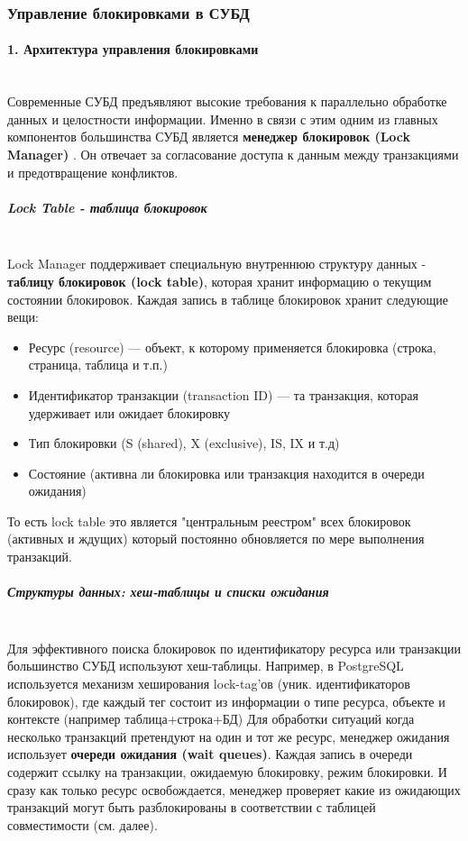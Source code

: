 \subsubsection{Управление блокировками в СУБД}

\paragraph{1. Архитектура управления блокировками} ~\\

Современные СУБД предъявляют высокие требования к параллельно обработке данных и целостности информации. Именно в связи с этим одним из главных компонентов большинства СУБД является \textbf{менеджер блокировок (Lock Manager)} \autocite{Silberschatz}. Он отвечает за согласование доступа к данным между транзакциями и предотвращение конфликтов.

\subparagraph{Lock Table - таблица блокировок} ~\\
 Lock Manager поддерживает специальную внутреннюю структуру данных - \textbf{таблицу блокировок (lock table)}, которая хранит информацию о текущим состоянии блокировок. Каждая запись в таблице блокировок хранит следующие вещи:
 \begin{itemize}
     \item Ресурс (resource) — объект, к которому применяется блокировка (строка, страница, таблица и т.п.)
     \item Идентификатор транзакции (transaction ID) — та транзакция, которая удерживает или ожидает блокировку
     \item Тип блокировки (S (shared), X (exclusive), IS, IX и т.д)
     \item Состояние (активна ли блокировка или транзакция находится в очереди ожидания)
 \end{itemize}
 То есть lock table это является "центральным реестром" всех блокировок (активных и ждущих) который постоянно обновляется по мере выполнения транзакций.

\subparagraph{Структуры данных: хеш-таблицы и списки ожидания} ~\\
 Для эффективного поиска блокировок по идентификатору ресурса или транзакции большинство СУБД используют хеш-таблицы. Например, в PostgreSQL используется механизм хеширования lock-tag'ов (уник. идентификаторов блокировок), где каждый тег состоит из информации о типе ресурса, объекте и контексте (например таблица+строка+БД)
 Для обработки ситуаций когда несколько транзакций претендуют на один и тот же ресурс, менеджер ожидания использует \textbf{очереди ожидания (wait queues)}. Каждая запись в очереди содержит ссылку на транзакции, ожидаемую блокировку, режим блокировки. И сразу как только ресурс освобождается, менеджер проверяет какие из ожидающих транзакций могут быть разблокированы в соответствии с таблицей совместимости (см. далее).

